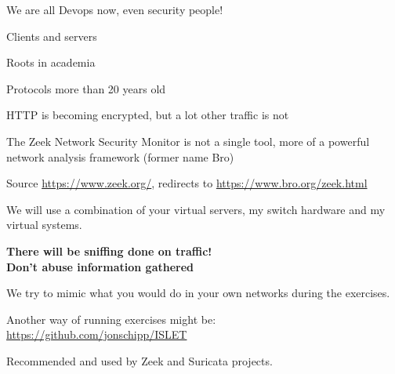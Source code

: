 \documentclass[Screen16to9,17pt]{foils}
\begin{document}
\centerline{We are all Devops now, even security people!}





\begin{list1}
\item Clients and servers
\item Roots in academia
\item Protocols more than 20 years old
\item HTTP is becoming encrypted, but a lot other traffic is not
\end{list1}





\centerline{}





The Zeek Network Security Monitor is not a single tool, more of a
powerful network analysis framework (former name Bro)

{\small Source \url{https://www.zeek.org/}, redirects to \url{https://www.bro.org/zeek.html}}




We will use a combination of your virtual servers, my switch hardware and my virtual systems.

\vskip 1cm
{\Large \bf There will be sniffing done on traffic!\\
Don't abuse information gathered}

We try to mimic what you would do in your own networks during the exercises.

Another way of running exercises might be:\\
\url{https://github.com/jonschipp/ISLET}

Recommended and used by Zeek and Suricata projects.








\myquestionspage
\end{document}
